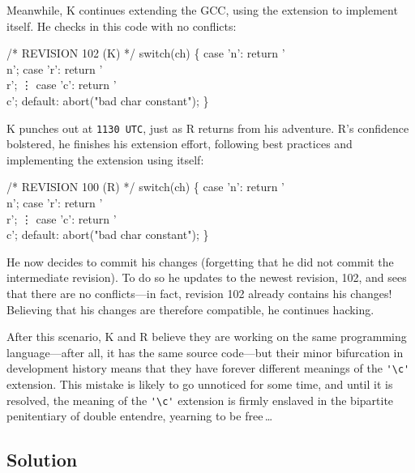 \documentclass[twocolumn]{article}
\begin{document}
Meanwhile, K continues extending the GCC, using the extension to
implement itself. He checks in this code with no conflicts:
%
\begin{code}
/* REVISION 102 (K) */
switch(ch) \{
  case 'n': return '\\n';
  case 'r': return '\\r';
  \vdots
  case 'c': return '\\c';
  default: abort("bad char constant");
\}
\end{code}
%
K punches out at {\tt 1130 UTC},\z{}
just as R returns from his adventure. R's confidence bolstered, he
finishes his extension effort, following best practices and
implementing the extension using itself:
%
\begin{code}
/* REVISION 100 (R) */
switch(ch) \{
  case 'n': return '\\n';
  case 'r': return '\\r';
  \vdots
  case 'c': return '\\c';
  default: abort("bad char constant");
\}
\end{code}
%
He now decides to commit his changes (forgetting that he did not
commit the intermediate revision). To do so he updates to the newest
revision, 102, and sees that there are no conflicts---in fact,
revision 102 already contains his changes! Believing that his changes
are therefore compatible, he continues hacking.

After this scenario, K and R believe they are working on the same
programming language---after all, it has the same source code---but
their minor bifurcation in development history means that they have
forever different meanings of the \verb+'\c'+ extension. This mistake
is likely to go unnoticed for some time, and until it is resolved, the
meaning of the \verb+'\c'+ extension is firmly enslaved in the
bipartite penitentiary of double entendre, yearning to be
free\,\ldots\z{}

\subsection{Solution}
\end{document}
